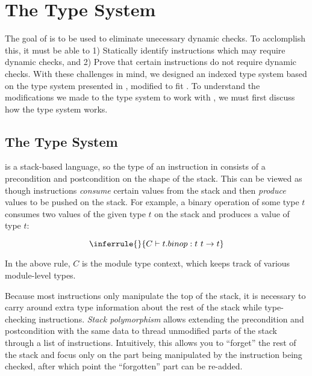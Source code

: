 \chapter{The \name Type System}
\label{chp:typesys}

The goal of \name is to be used to eliminate unecessary dynamic checks.
To acclomplish this, it must be able to 1) Statically identify instructions which may require dynamic checks, and 2) Prove that certain instructions do not require dynamic checks.
With these challenges in mind, we designed an indexed type system based on the type system presented in \dtal, modified to fit \wasm.
To understand the modifications we made to the \name type system to work with \wasm, we must first discuss how the \wasm type system works.




\section{The \wasm Type System}
\wasm is a stack-based language, so the type of an instruction in \wasm consists of a precondition and postcondition on the shape of the stack.
This can be viewed as though instructions \emph{consume} certain values from the stack and then \emph{produce} values to be pushed on the stack.
For example, a binary operation of some type $t$ consumes two values of the given type $t$ on the stack and produces a value of type $t$:

\[
    \inferrule{ }{C \vdash t.binop : t\ t \rightarrow t}
\]

In the above rule, $C$ is the module type context, which keeps track of various module-level types.

Because most instructions only manipulate the top of the stack, it is necessary to carry around extra type information about the rest of the stack while type-checking instructions.
\emph{Stack polymorphism} allows extending the precondition and postcondition with the same data to thread unmodified parts of the stack through a list of instructions.
Intuitively, this allows you to ``forget'' the rest of the stack and focus only on the part being manipulated by the instruction being checked, after which point the ``forgotten'' part can be re-added.

